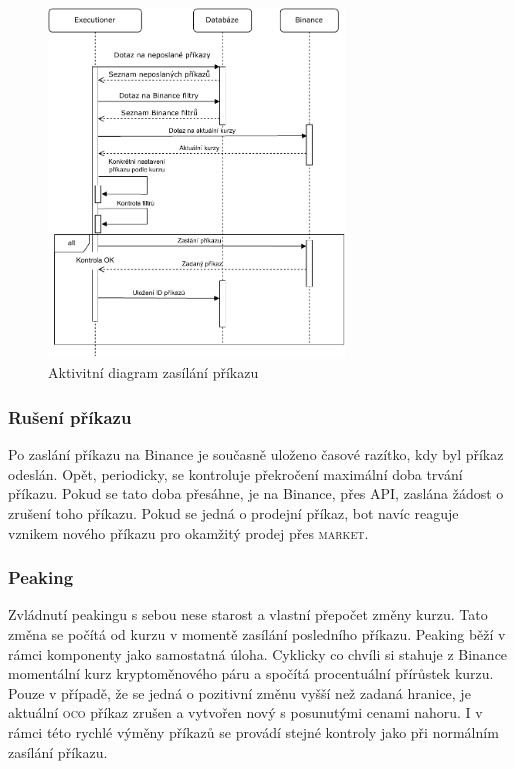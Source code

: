 \begin{figure}
    \centering
    \includegraphics[width=0.7\textwidth]{Figures/Trading-bot-sequence.pdf}
    \caption{Aktivitní diagram zasílání příkazu}
    \label{figure:sending-trade-order}
\end{figure}

\subsubsection{Rušení příkazu}
Po zaslání příkazu na Binance je současně uloženo časové razítko, kdy byl příkaz odeslán. Opět, periodicky, se kontroluje překročení maximální doba trvání příkazu. Pokud se tato doba přesáhne,
je na Binance, přes API, zaslána žádost o zrušení toho příkazu. Pokud se jedná o prodejní příkaz, bot navíc reaguje vznikem nového příkazu pro okamžitý prodej přes \textsc{market}.

\subsubsection{Peaking}
Zvládnutí peakingu s sebou nese starost a vlastní přepočet změny kurzu. Tato změna se počítá od kurzu v momentě zasílání posledního příkazu. Peaking běží v rámci komponenty jako samostatná úloha.
Cyklicky co chvíli si stahuje z Binance momentální kurz kryptoměnového páru a spočítá procentuální přírůstek kurzu. Pouze v případě, že se jedná o pozitivní změnu vyšší než zadaná hranice, je
aktuální \textsc{oco} příkaz zrušen a vytvořen nový s posunutými cenami nahoru. I v rámci této rychlé výměny příkazů se provádí stejné kontroly jako při normálním zasílání příkazu.

